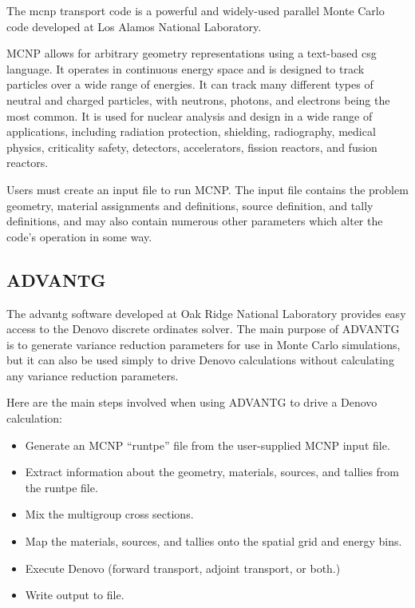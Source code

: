 The \ac{mcnp} transport code \cite{mcnp620} is a powerful and widely-used parallel Monte Carlo code developed at Los Alamos National Laboratory.

MCNP allows for arbitrary geometry representations using a text-based \ac{csg} language.
It operates in continuous energy space and is designed to track particles over a wide range of energies.
It can track many different types of neutral and charged particles, with neutrons, photons, and electrons being the most common.
It is used for nuclear analysis and design in a wide range of applications, including radiation protection, shielding, radiography, medical physics, criticality safety, detectors, accelerators, fission reactors, and fusion reactors.

Users must create an input file to run MCNP.
The input file contains the problem geometry, material assignments and definitions, source definition, and tally definitions, and may also contain numerous other parameters which alter the code's operation in some way.

\subsection{ADVANTG}
\label{sec:bg:rt:advantg}

The \ac{advantg} \cite{advantg} software developed at Oak Ridge National Laboratory provides easy access to the Denovo discrete ordinates solver.
The main purpose of ADVANTG is to generate variance reduction parameters for use in Monte Carlo simulations, but it can also be used simply to drive Denovo calculations without calculating any variance reduction parameters.

Here are the main steps involved when using ADVANTG to drive a Denovo calculation:
\begin{itemize}
  \item Generate an MCNP ``runtpe'' file from the user-supplied MCNP input file.
  \item Extract information about the geometry, materials, sources, and tallies from the runtpe file.
  \item Mix the multigroup cross sections.
  \item Map the materials, sources, and tallies onto the spatial grid and energy bins.
  \item Execute Denovo (forward transport, adjoint transport, or both.)
  \item Write output to file.
\end{itemize}

